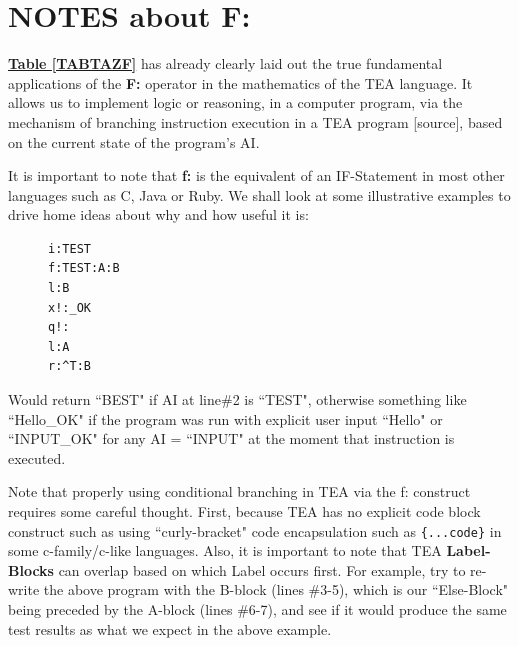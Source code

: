 \documentclass[a4paper, 18pt]{book} %
\begin{document}
\section{NOTES about F:}
\label{SECNOTESF}

\textbf{\hyperref[TABTAZF]{Table \ref{TABTAZF}}} has already clearly laid out the true fundamental applications of the \textbf{F:} operator in the mathematics of the TEA language. It allows us to implement logic or reasoning, in a computer program, via the mechanism of branching instruction execution in a TEA program [source], based on the current state of the program's AI.

\vspace{1em}

It is important to note that \textbf{f:} is the equivalent of an IF-Statement in most other languages such as C, Java or Ruby. We shall look at some illustrative examples to drive home ideas about why and how useful it is:



\begin{figure}[H]
 \Large
  \centering
  \begin{tcolorbox}[teaterminalstyle, title=F: EXAMPLE 1]
  \begin{lstlisting}[language=TEA]
i:TEST
f:TEST:A:B
l:B
x!:_OK
q!:
l:A
r:^T:B 
   \end{lstlisting}
  \end{tcolorbox}
\end{figure}


Would return ``BEST" if AI at line\#2 is ``TEST", otherwise something like ``Hello\_OK" if the program was run with explicit user input ``Hello" or ``INPUT\_OK" for any AI = ``INPUT" at the moment that instruction is executed.

\vspace{1em}

Note that properly using conditional branching in TEA via the f: construct requires some careful thought. First, because TEA has no explicit code block construct such as using ``curly-bracket" code encapsulation such as \texttt{\{...code\}} in some c-family/c-like languages. Also, it is important to note that TEA \textbf{Label-Blocks} can overlap based on which Label occurs first. For example, try to re-write the above program with the B-block (lines \#3-5), which is our ``Else-Block" being preceded by the A-block (lines \#6-7), and see if it would produce the same test results as what we expect in the above example.
\end{document}
